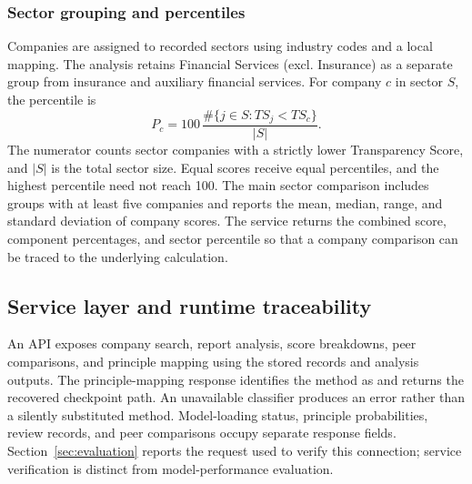\subsubsection{Sector grouping and percentiles}

Companies are assigned to recorded sectors using industry codes and a local mapping. The analysis retains Financial Services (excl. Insurance) as a separate group from insurance and auxiliary financial services. For company $c$ in sector $S$, the percentile is
\begin{equation}
P_c=100\,\frac{\#\{j\in S:TS_j<TS_c\}}{|S|}.
\label{eq:percentile}
\end{equation}
The numerator counts sector companies with a strictly lower Transparency Score, and $|S|$ is the total sector size. Equal scores receive equal percentiles, and the highest percentile need not reach 100. The main sector comparison includes groups with at least five companies and reports the mean, median, range, and standard deviation of company scores. The service returns the combined score, component percentages, and sector percentile so that a company comparison can be traced to the underlying calculation.

\subsection{Service layer and runtime traceability}
\label{sec:api}

An API exposes company search, report analysis, score breakdowns, peer comparisons, and principle mapping using the stored records and analysis outputs. The principle-mapping response identifies the method as  and returns the recovered checkpoint path. An unavailable classifier produces an error rather than a silently substituted method. Model-loading status, principle probabilities, review records, and peer comparisons occupy separate response fields. Section~\ref{sec:evaluation} reports the request used to verify this connection; service verification is distinct from model-performance evaluation.
